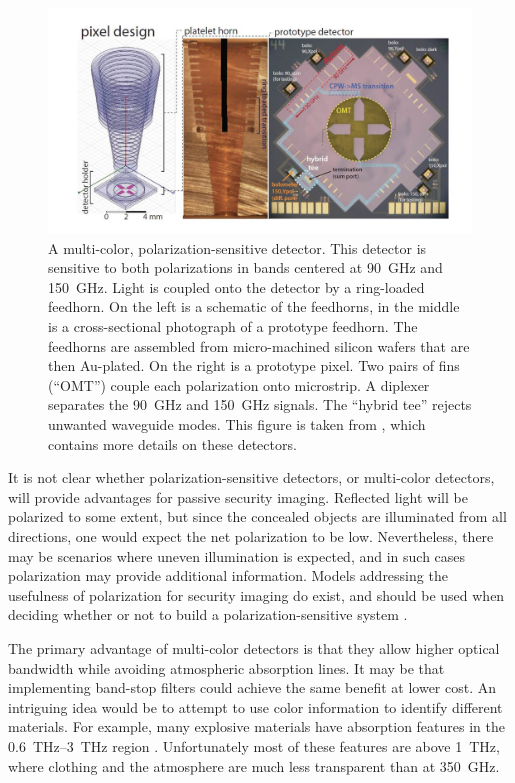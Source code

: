 \begin{figure}
\centering
\includegraphics[width=\textwidth]{images/ch8-multi-chroic.jpg}
\caption[Multi-color, polarization-sensitive detectors]{
  A multi-color, polarization-sensitive detector.
  This detector is sensitive to both polarizations in bands centered at \SI{90}{\GHz} and \SI{150}{\GHz}.
  Light is coupled onto the detector by a ring-loaded feedhorn.
  On the left is a schematic of the feedhorns, in the middle is a cross-sectional photograph of a prototype feedhorn.
  The feedhorns are assembled from micro-machined silicon wafers that are then Au-plated.
  On the right is a prototype pixel.
  Two pairs of fins (``OMT'') couple each polarization onto microstrip.
  A diplexer separates the \SI{90}{\GHz} and \SI{150}{\GHz} signals.
  The ``hybrid tee'' rejects unwanted waveguide modes.
  This figure is taken from \cite{datta_horn_2014}, which contains more details on these detectors.
}
\label{fig:ch8-multi-chroic}
\end{figure}

It is not clear whether polarization-sensitive detectors, or multi-color detectors, will provide advantages for passive security imaging.
Reflected light will be polarized to some extent, but since the concealed objects are illuminated from all directions, one would expect the net polarization to be low.
Nevertheless, there may be scenarios where uneven illumination is expected, and in such cases polarization may provide additional information.
Models addressing the usefulness of polarization for security imaging do exist, and should be used when deciding whether or not to build a polarization-sensitive system \cite{salmon_polarimetric_2004}.

The primary advantage of multi-color detectors is that they allow higher optical bandwidth while avoiding atmospheric absorption lines.
It may be that implementing band-stop filters could achieve the same benefit at lower cost.
An intriguing idea would be to attempt to use color information to identify different materials.
For example, many explosive materials have absorption features in the \SIrange{0.6}{3}{\THz} region \cite{federici_thz_2005,davies_terahertz_2008}.
Unfortunately most of these features are above \SI{1}{\THz}, where clothing and the atmosphere are much less transparent than at \SI{350}{\GHz}.


